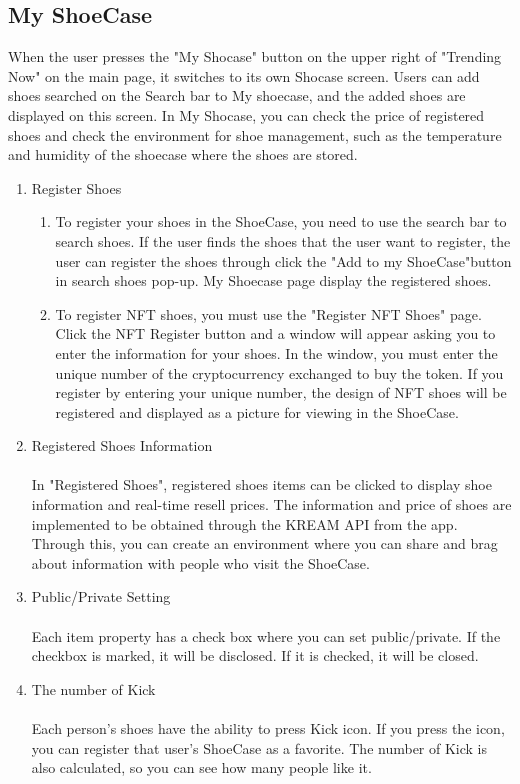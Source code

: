 \documentclass[conference]{IEEEtran}
\begin{document}
\begin{enumerate}
\end{enumerate}

\subsection{My ShoeCase}
When the user presses the "My Shocase" button on the upper right of "Trending Now" on the main page, it switches to its own Shocase screen. Users can add shoes searched on the Search bar to My shoecase, and the added shoes are displayed on this screen. In My Shocase, you can check the price of registered shoes and check the environment for shoe management, such as the temperature and humidity of the shoecase where the shoes are stored.\\
\begin{enumerate}
	\item Register Shoes
	\begin{enumerate}
	\item To register your shoes in the ShoeCase, you need to use the search bar to search shoes. If the user finds the shoes that the user want to register, the user can register the shoes through click the "Add to my ShoeCase"button in search shoes pop-up. My Shoecase page display the registered shoes.\\
	\item To register NFT shoes, you must use the "Register NFT Shoes" page. Click the NFT Register button and a window will appear asking you to enter the information for your shoes. In the window, you must enter the unique number of the cryptocurrency exchanged to buy the token. If you register by entering your unique number, the design of NFT shoes will be registered and displayed as a picture for viewing in the ShoeCase.\\
	\end{enumerate}
	\item Registered Shoes Information\\
\\In "Registered Shoes", registered shoes items can be clicked to display shoe information and real-time resell prices. 
The information and price of shoes are implemented to be obtained through the KREAM API from the app. 
Through this, you can create an environment where you can share and brag about information with people who visit the ShoeCase.\\
	\item Public/Private Setting\\
\\Each item property has a check box where you can set public/private. 
If the checkbox is marked, it will be disclosed. If it is checked, it will be closed.\\
	\item The number of Kick\\
\\Each person's shoes have the ability to press Kick icon. 
If you press the icon, you can register that user's ShoeCase as a favorite.
The number of Kick is also calculated, so you can see how many people like it.\\
\end{enumerate}
\end{document}
